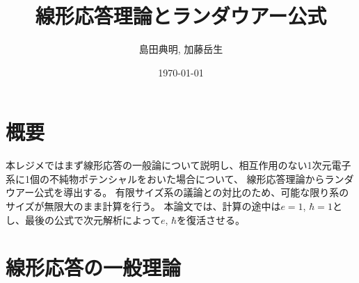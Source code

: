 \documentclass[10pt,a4j]{jarticle}
\title{線形応答理論とランダウアー公式}
\author{島田典明, 加藤岳生}
\date{\today}
\begin{document}
\maketitle

\section{概要}

本レジメではまず線形応答の一般論について説明し、相互作用のない1次元電子系に1個の不純物ポテンシャルをおいた場合について、
線形応答理論からランダウアー公式を導出する\cite{Bruus04}。
有限サイズ系の議論との対比のため、可能な限り系のサイズが無限大のまま計算を行う。
本論文では、計算の途中は$e=1$, $\hbar=1$とし、最後の公式で次元解析によって$e$, $\hbar$を復活させる。

\section{線形応答の一般理論}
\end{document}
